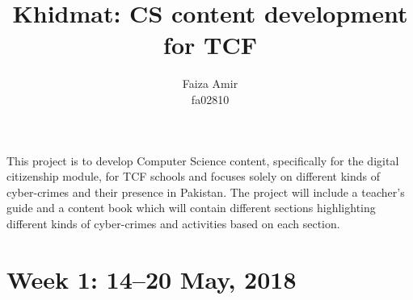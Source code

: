 \documentclass{article}
\title {Khidmat: CS content development for TCF}
\author{
  Faiza Amir \\ fa02810
}
\date{}
\begin{document}
\maketitle



This project is to develop Computer Science content, specifically for the digital citizenship module, for TCF schools and focuses solely on different kinds of cyber-crimes and their presence in Pakistan. The project will include a teacher's guide and a content book which will contain different sections highlighting different kinds of cyber-crimes and activities based on each section. 




\newpage %
\section*{Week 1: 14--20 May, 2018}
\end{document}
